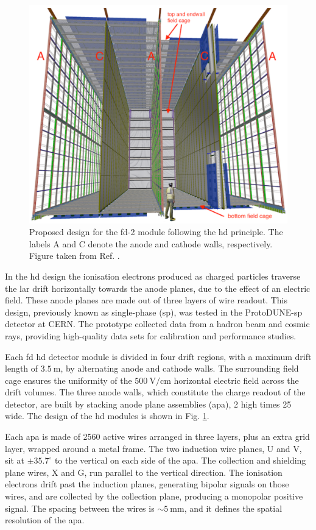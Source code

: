 \begin{figure}[t]
	\centering
	\includegraphics[width=0.65\linewidth]{Images/DUNE/FD/dune_hd}
	\caption[Proposed design for the \gls{fd}-2 module following the \gls{hd} principle.]{Proposed design for the \gls{fd}-2 module following the \gls{hd} principle. The labels A and C denote the anode and cathode walls, respectively. Figure taken from Ref. \cite{DUNE2020TDR1}.}
	\label{fig:dune_hd}
\end{figure}

In the \gls{hd} design the ionisation electrons produced as charged particles traverse the \gls{lar} drift horizontally towards the anode planes, due to the effect of an electric field. These anode planes are made out of three layers of wire readout. This design, previously known as single-phase (\gls{sp}), was tested in the ProtoDUNE-\gls{sp} detector at CERN. The prototype collected data from a hadron beam and cosmic rays, providing high-quality data sets for calibration and performance studies.

Each \gls{fd} \gls{hd} detector module is divided in four drift regions, with a maximum drift length of $3.5~\mathrm{m}$, by alternating anode and cathode walls. The surrounding field cage ensures the uniformity of the $500~\mathrm{V/cm}$ horizontal electric field across the drift volumes. The three anode walls, which constitute the charge readout of the detector, are built by stacking anode plane assemblies (\gls{apa}), 2 high times 25 wide. The design of the \gls{hd} modules is shown in Fig. \ref{fig:dune_hd}.

Each \gls{apa} is made of 2560 active wires arranged in three layers, plus an extra grid layer, wrapped around a metal frame. The two induction wire planes, U and V, sit at $\pm 35.7^{\circ}$ to the vertical on each side of the \gls{apa}. The collection and shielding plane wires, X and G, run parallel to the vertical direction. The ionisation electrons drift past the induction planes, generating bipolar signals on those wires, and are collected by the collection plane, producing a monopolar positive signal. The spacing between the wires is $\sim 5~\mathrm{mm}$, and it defines the spatial resolution of the \gls{apa}.

